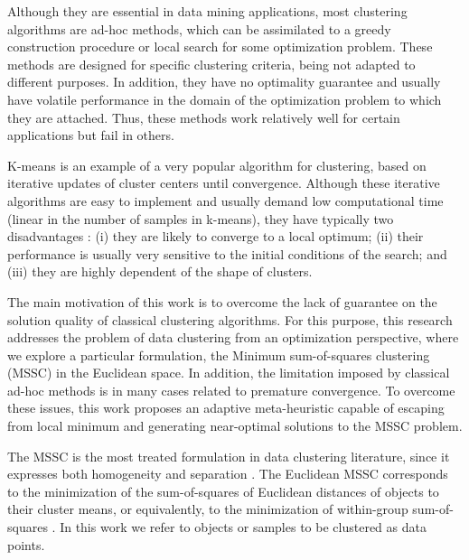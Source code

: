 Although they are essential in data mining applications, most clustering algorithms are ad-hoc methods, which can be assimilated to a greedy construction procedure or local search for some optimization problem. These methods are designed for specific clustering criteria, being not adapted to different purposes. In addition, they have no optimality guarantee and usually have volatile performance in the domain of the optimization problem to which they are attached. Thus, these methods work relatively well for certain applications but fail in others.

K-means is an example of a very popular algorithm for clustering, based on iterative updates of cluster centers until convergence. Although these iterative algorithms are easy to implement and usually demand low computational time (linear in the number of samples in k-means), they have typically two disadvantages \cite{Das2009}: (i) they are likely to converge to a local optimum; (ii) their performance is usually very sensitive to the initial conditions of the search; and (iii) they are highly dependent of the shape of clusters.

The main motivation of this work is to overcome the lack of guarantee on the solution quality of classical clustering algorithms. For this purpose, this research addresses the problem of data clustering from an optimization perspective, where we explore a particular formulation, the Minimum sum-of-squares clustering (MSSC) in the Euclidean space. In addition, the limitation imposed by classical ad-hoc methods is in many cases related to premature convergence. To overcome these issues, this work proposes an adaptive meta-heuristic capable of escaping from local minimum and generating near-optimal solutions to the MSSC problem.

The MSSC is the most treated formulation in data clustering literature, since it expresses both homogeneity and separation \cite{Hansen2009}. The Euclidean MSSC corresponds to the minimization of the sum-of-squares of Euclidean distances of objects to their cluster means, or equivalently, to the minimization of within-group sum-of-squares \cite{Xavier2011}. In this work we refer to objects or samples to be clustered as data points.


